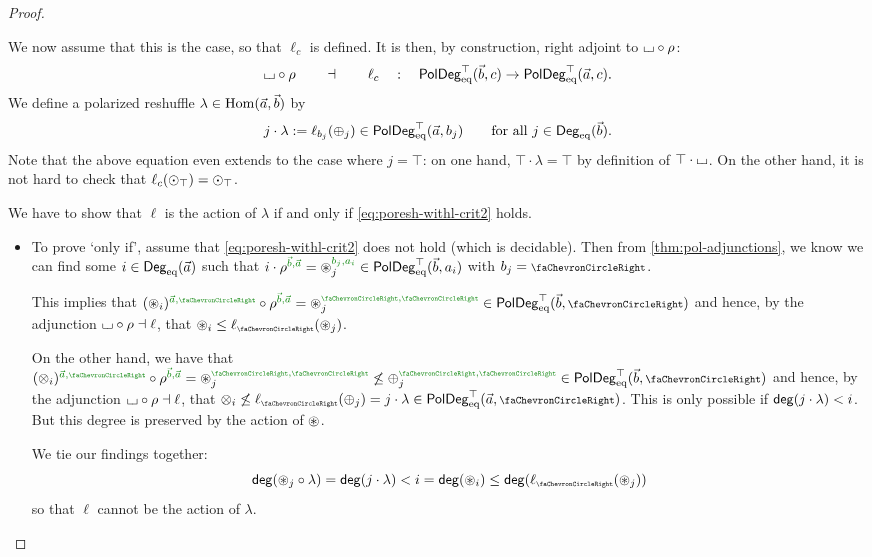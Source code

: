 \documentclass[a4paper]{memoir}
\begin{document}
\begin{proof}
\begin{enumerate}
		We now assume that this is the case, so that $\ell_c$ is defined.
		It is then, by construction, right adjoint to ${\llcorner\hspace{-.4ex}\lrcorner} \circ \rho$:
		\begin{equation}
			{\llcorner\hspace{-.4ex}\lrcorner} \circ \rho \qquad \dashv \qquad \ell_c \quad : \quad \mathsf{PolDeg}_{\mathrm{eq}}^\top(\vec b, c) \to \mathsf{PolDeg}_{\mathrm{eq}}^\top(\vec a, c).
		\end{equation}
		We define a polarized reshuffle $\lambda \in {\mathrm{Hom}}(\vec a, \vec b)$ by
		\begin{equation}
			j \cdot \lambda := \ell_{b_j}({\oplus}_j) \in \mathsf{PolDeg}_{\mathrm{eq}}^\top(\vec a, b_j) \qquad \text{for all $j \in {\mathsf{Deg}_{\mathrm{eq}}}(\vec b)$}.
		\end{equation}
		Note that the above equation even extends to the case where $j = \top$: on one hand, $\top \cdot \lambda = \top$ by definition of $\top \cdot {\llcorner\hspace{-.4ex}\lrcorner}$.
		On the other hand, it is not hard to check that $\ell_c({\odot}_\top) = {\odot}_\top$.
		
		We have to show that $\ell$ is the action of $\lambda$ if and only if \cref{eq:poresh-withl-crit2} holds.
		\begin{itemize}
			\item To prove `only if', assume that \cref{eq:poresh-withl-crit2} does not hold (which is decidable). Then from \cref{thm:pol-adjunctions}, we know we can find some $i \in {\mathsf{Deg}_{\mathrm{eq}}}(\vec a)$ such that $i \cdot \rho\pmrhom{\vec b}{\vec a} = \isopol_j\pmrhom{b_j}{a_i} \in \poldegeqtop(\vec b, a_i)$ with $b_j = \ypolar$.
			
			This implies that $(\isopol_i)\pmrhom{\vec a}{\ypolar} \circ \rho\pmrhom{\vec b}{\vec a} = \isopol_j\pmryy \in \poldegeqtop(\vec b, \ypolar)$ and hence, by the adjunction ${\llcorner\hspace{-.4ex}\lrcorner} \circ \rho \dashv \ell$, that $\isopol_i \leq \ell_{\ypolar}(\isopol_j)$.
			
			On the other hand, we have that $(\mixpol_i)\pmrhom{\vec a}{\ypolar} \circ \rho\pmrhom{\vec b}{\vec a} = \isopol_j\pmryy \not\leq \pospol_j\pmryy \in \poldegeqtop(\vec b, \ypolar)$ and hence, by the adjunction ${\llcorner\hspace{-.4ex}\lrcorner} \circ \rho \dashv \ell$, that $\mixpol_i \not\leq \ell_\ypolar(\pospol_j) = j \cdot \lambda \in \poldegeqtop(\vec a, \ypolar)$.
			This is only possible if $\mathsf{deg}(j \cdot \lambda) < i$.
			But this degree is preserved by the action of ${\oast}$.
			
			We tie our findings together:
			\[
				\getdeg(\isopol_j \circ \lambda) = \getdeg(j \cdot \lambda) < i = \getdeg(\isopol_i) \leq \getdeg(\ell_\ypolar(\isopol_j))
			\]
			so that $\ell$ cannot be the action of $\lambda$.
			

\end{itemize}
\end{enumerate}
\end{proof}
\end{document}
